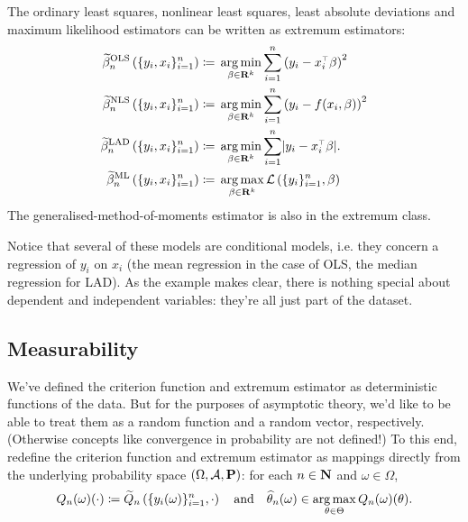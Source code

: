 \documentclass[11pt,letterpaper,reqno,oneside]{article}
\begin{document}
\begin{example}
	The ordinary least squares, nonlinear least squares, least absolute deviations and maximum likelihood estimators can be written as extremum estimators:
	\begin{align*}
		\widetilde{\beta}^{\mathrm{OLS}}_n\left( \{y_i,x_i\}_{i=1}^n \right)
		\coloneqq{}& \argmin_{\beta \in \R^k} \sum_{i=1}^n 
		\left( y_i - x_i^\trans \beta \right)^2
		\\
		\widetilde{\beta}^{\mathrm{NLS}}_n\left( \{y_i,x_i\}_{i=1}^n \right)
		\coloneqq{}& \argmin_{\beta \in \R^k} \sum_{i=1}^n 
		\left( y_i - f(x_i,\beta) \right)^2
		\\
		\widetilde{\beta}^{\mathrm{LAD}}_n\left( \{y_i,x_i\}_{i=1}^n \right)
		\coloneqq{}& \argmin_{\beta \in \R^k} \sum_{i=1}^n \abs*{ y_i - x_i^\trans \beta } .
		\\
		\widetilde{\beta}^{\mathrm{ML}}_n\left( \{y_i,x_i\}_{i=1}^n \right)
		\coloneqq{}& \argmax_{\beta \in \R^k} 
		\mathcal{L}\left( \{y_i\}_{i=1}^n, \beta \right)
	\end{align*}
	The generalised-method-of-moments estimator is also in the extremum class.

	Notice that several of these models are conditional models, i.e. they concern a regression of $y_i$ on $x_i$ (the mean regression in the case of OLS, the median regression for LAD). As the example makes clear, there is nothing special about dependent and independent variables: they're all just part of the dataset.
\end{example}



\subsection{Measurability}
\label{sec:extremum:measurability}

We've defined the criterion function and extremum estimator as deterministic functions of the data. But for the purposes of asymptotic theory, we'd like to be able to treat them as a random function and a random vector, respectively. (Otherwise concepts like convergence in probability are not defined!) To this end, redefine the criterion function and extremum estimator as mappings directly from the underlying probability space $(\Omega,\mathcal{A},\mathbf{P})$: for each $n \in \mathbf{N}$ and $\omega \in \Omega$,
%
\begin{equation*}
	Q_n(\omega)(\cdot) \coloneqq
	\widetilde{Q}_n\left( \{y_i(\omega)\}_{i=1}^n, \cdot \right)
	\quad\text{and}\quad
	\widehat{\theta}_n(\omega)
	\in \operatorname*{arg\,max}_{\theta\in\Theta} Q_n(\omega)(\theta) .
\end{equation*}
\end{document}
